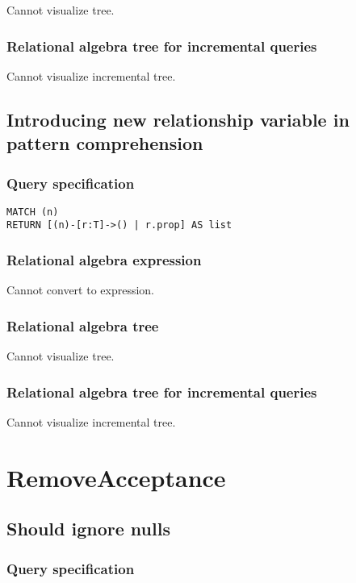 Cannot visualize tree.

\subsubsection*{Relational algebra tree for incremental queries}

Cannot visualize incremental tree.

\subsection{Introducing new relationship variable in pattern comprehension}

\subsubsection*{Query specification}

\begin{lstlisting}
MATCH (n)
RETURN [(n)-[r:T]->() | r.prop] AS list
\end{lstlisting}

\subsubsection*{Relational algebra expression}

Cannot convert to expression.

\subsubsection*{Relational algebra tree}

Cannot visualize tree.

\subsubsection*{Relational algebra tree for incremental queries}

Cannot visualize incremental tree.

\section{RemoveAcceptance}

\subsection{Should ignore nulls}

\subsubsection*{Query specification}

